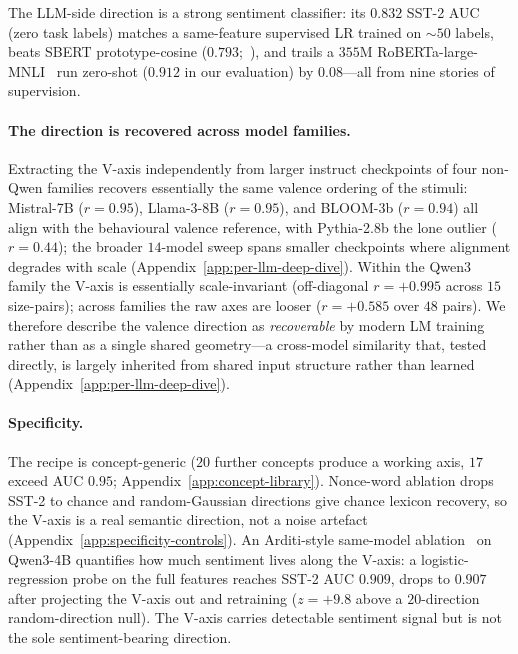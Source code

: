 The LLM-side direction is a strong sentiment classifier: its $0.832$
SST-2 AUC (zero task labels) matches a same-feature supervised LR
trained on ${\sim}50$ labels, beats
SBERT prototype-cosine ($0.793$;~\citealp{reimers2019sbert}), and
trails a $355$M RoBERTa-large-MNLI~\citep{liu2019roberta} run
zero-shot ($0.912$ in our evaluation) by $0.08$---all from nine
stories of supervision.

\paragraph{The direction is recovered across model families.}
Extracting the V-axis independently from larger instruct checkpoints of
four non-Qwen families recovers essentially the same valence ordering of
the stimuli: Mistral-7B ($r{=}0.95$), Llama-3-8B ($r{=}0.95$), and
BLOOM-3b ($r{=}0.94$) all align with the behavioural valence reference,
with Pythia-2.8b the lone outlier ($r{=}0.44$); the broader $14$-model
sweep spans smaller checkpoints where alignment degrades with scale
(Appendix~\ref{app:per-llm-deep-dive}).
Within the Qwen3 family the V-axis is essentially
scale-invariant (off-diagonal $r{=}{+}0.995$ across $15$ size-pairs);
across families the raw axes are looser ($r{=}{+}0.585$ over $48$
pairs). We therefore describe the valence direction as
\emph{recoverable} by modern LM training rather than as a single shared
geometry---a cross-model similarity that, tested directly, is largely
inherited from shared input structure rather than learned
(Appendix~\ref{app:per-llm-deep-dive}).

\paragraph{Specificity.}
The recipe is concept-generic ($20$ further concepts produce a
working axis, $17$ exceed AUC $0.95$;
Appendix~\ref{app:concept-library}). Nonce-word ablation drops SST-2
to chance and random-Gaussian directions give chance lexicon recovery,
so the V-axis is a real semantic direction, not a noise artefact
(Appendix~\ref{app:specificity-controls}). An Arditi-style same-model
ablation~\citep{arditi2024refusal} on Qwen3-4B quantifies how much
sentiment lives along the V-axis: a logistic-regression probe on the
full features reaches SST-2 AUC $0.909$, drops to $0.907$ after
projecting the V-axis out and retraining ($z{=}{+}9.8$ above a
$20$-direction random-direction null). The V-axis carries detectable
sentiment signal but is not the sole sentiment-bearing direction.
